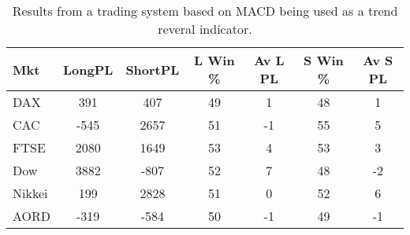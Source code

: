 \begin{table}[ht]
\centering
\caption[Results from a system based on MACD as trend reversal indicator]{Results from a trading system based on MACD being used as a trend reveral indicator.} 
\label{tab:mac_ob_results}
\begin{tabular}{lcccccc}
  \toprule Mkt & LongPL & ShortPL & L Win \% & Av L PL & S Win \% & Av S PL \\ 
  \midrule DAX & 391 & 407 & 49 & 1 & 48 & 1 \\ 
  CAC & -545 & 2657 & 51 & -1 & 55 & 5 \\ 
  FTSE & 2080 & 1649 & 53 & 4 & 53 & 3 \\ 
  Dow & 3882 & -807 & 52 & 7 & 48 & -2 \\ 
  Nikkei & 199 & 2828 & 51 & 0 & 52 & 6 \\ 
  AORD & -319 & -584 & 50 & -1 & 49 & -1 \\ 
   \bottomrule \end{tabular}
\end{table}
